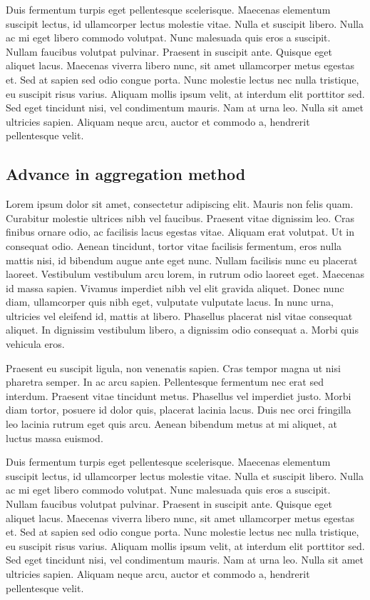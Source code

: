 \documentclass[english]{tktltiki}
\begin{document}
Duis fermentum turpis eget pellentesque scelerisque. Maecenas elementum suscipit lectus, id ullamcorper lectus molestie vitae. Nulla et suscipit libero. Nulla ac mi eget libero commodo volutpat. Nunc malesuada quis eros a suscipit. Nullam faucibus volutpat pulvinar. Praesent in suscipit ante. Quisque eget aliquet lacus. Maecenas viverra libero nunc, sit amet ullamcorper metus egestas et. Sed at sapien sed odio congue porta. Nunc molestie lectus nec nulla tristique, eu suscipit risus varius. Aliquam mollis ipsum velit, at interdum elit porttitor sed. Sed eget tincidunt nisi, vel condimentum mauris. Nam at urna leo. Nulla sit amet ultricies sapien. Aliquam neque arcu, auctor et commodo a, hendrerit pellentesque velit.


\subsection{Advance in aggregation method}


Lorem ipsum dolor sit amet, consectetur adipiscing elit. Mauris non felis quam. Curabitur molestie ultrices nibh vel faucibus. Praesent vitae dignissim leo. Cras finibus ornare odio, ac facilisis lacus egestas vitae. Aliquam erat volutpat. Ut in consequat odio. Aenean tincidunt, tortor vitae facilisis fermentum, eros nulla mattis nisi, id bibendum augue ante eget nunc. Nullam facilisis nunc eu placerat laoreet. Vestibulum vestibulum arcu lorem, in rutrum odio laoreet eget. Maecenas id massa sapien. Vivamus imperdiet nibh vel elit gravida aliquet. Donec nunc diam, ullamcorper quis nibh eget, vulputate vulputate lacus. In nunc urna, ultricies vel eleifend id, mattis at libero. Phasellus placerat nisl vitae consequat aliquet. In dignissim vestibulum libero, a dignissim odio consequat a. Morbi quis vehicula eros.

Praesent eu suscipit ligula, non venenatis sapien. Cras tempor magna ut nisi pharetra semper. In ac arcu sapien. Pellentesque fermentum nec erat sed interdum. Praesent vitae tincidunt metus. Phasellus vel imperdiet justo. Morbi diam tortor, posuere id dolor quis, placerat lacinia lacus. Duis nec orci fringilla leo lacinia rutrum eget quis arcu. Aenean bibendum metus at mi aliquet, at luctus massa euismod.

Duis fermentum turpis eget pellentesque scelerisque. Maecenas elementum suscipit lectus, id ullamcorper lectus molestie vitae. Nulla et suscipit libero. Nulla ac mi eget libero commodo volutpat. Nunc malesuada quis eros a suscipit. Nullam faucibus volutpat pulvinar. Praesent in suscipit ante. Quisque eget aliquet lacus. Maecenas viverra libero nunc, sit amet ullamcorper metus egestas et. Sed at sapien sed odio congue porta. Nunc molestie lectus nec nulla tristique, eu suscipit risus varius. Aliquam mollis ipsum velit, at interdum elit porttitor sed. Sed eget tincidunt nisi, vel condimentum mauris. Nam at urna leo. Nulla sit amet ultricies sapien. Aliquam neque arcu, auctor et commodo a, hendrerit pellentesque velit.
\end{document}
